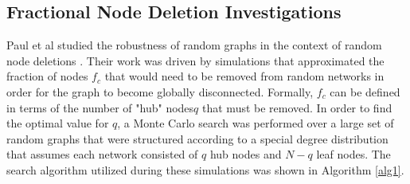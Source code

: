 \documentclass[doc]{apa}%
\begin{document}

\subsection{Fractional Node Deletion Investigations} 
Paul et al studied the robustness of random graphs in the context of random node deletions \cite{Paul}. Their work was driven by simulations that approximated the fraction of nodes $f_c$ that would need to be removed from random networks in order for the graph to become globally disconnected. Formally, $f_c$ can be defined in terms of the number of "hub" nodes$q$ that must be removed. In order to find the optimal value for $q$, a Monte Carlo search was performed over a large set of random graphs that were structured according to a special degree distribution that assumes each network consisted of $q$ hub nodes and $N - q$ leaf nodes. The search algorithm utilized during these simulations was shown in Algorithm \ref{alg1}. 
\end{document}
